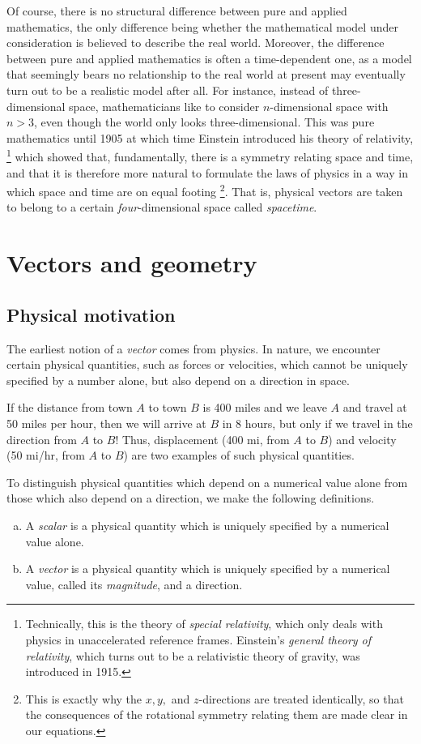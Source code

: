 \documentclass[12pt,letterpaper,reqno]{article}
\numberwithin{equation}{section}
\newcommand{\ti}[1]{\textit{#1}}
\begin{document}
Of course, there is no structural difference between pure and applied mathematics,  the only difference being whether the mathematical model under consideration is believed to describe the real world. Moreover, the difference between pure and applied mathematics is often a time-dependent one, as a model that seemingly bears no relationship to the real world at present may eventually turn out to be a realistic model after all. For instance, instead of three-dimensional space, mathematicians like to consider $n$-dimensional space with $n>3$, even though the world only looks three-dimensional. This was pure mathematics until 1905 at which time Einstein introduced his theory of relativity, \footnote{Technically, this is the theory of \ti{special relativity}, which only deals with physics in unaccelerated reference frames. Einstein's \ti{general theory of relativity}, which turns out to be a relativistic theory of gravity, was introduced in 1915.} which showed that, fundamentally, there is a symmetry relating space and time, and that it is therefore more natural to formulate the laws of physics in a way in which space and time are on equal footing \footnote{This is exactly why the $x,y,$ and $z$-directions are treated identically, so that the consequences of the rotational symmetry relating them are made clear in our equations.}. That is, physical vectors are taken to belong to a certain \ti{four}-dimensional space called \ti{spacetime}.

\section{Vectors and geometry}
\subsection{Physical motivation}
The earliest notion of a \ti{vector} comes from physics. In nature, we encounter certain physical quantities, such as forces or velocities, which cannot be uniquely specified by a number alone, but also depend on a direction in space. 

\begin{example}
If the distance from town $A$ to town $B$ is 400 miles and we leave $A$ and travel at 50 miles per hour, then we will arrive at $B$ in 8 hours, but only if we travel in the direction from $A$ to $B$! Thus, displacement (400 mi, from $A$ to $B$) and velocity (50 mi/hr, from $A$ to $B$) are two examples of such physical quantities.
\end{example}
To distinguish physical quantities which depend on a numerical value alone from those which also depend on a direction, we make the following definitions. 
\begin{defn}
\begin{enumerate}[(a)] \hspace{10cm}
	\item A \ti{scalar} is a physical quantity which is uniquely specified by a numerical value alone.
	\item A \ti{vector} is a physical quantity which is uniquely specified by a numerical value, called its \ti{magnitude}, and a direction.
\end{enumerate}
\end{defn}
\end{document}
